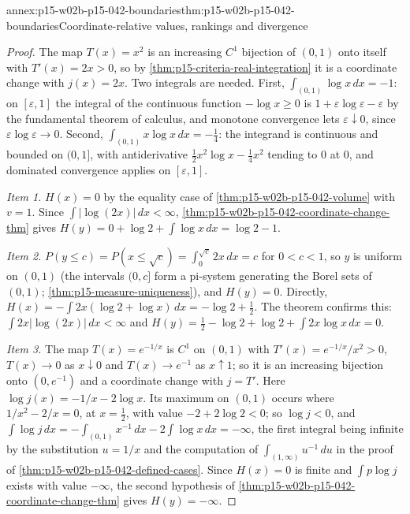 \begin{annexitem}{annex:p15-w02b-p15-042-boundaries}{thm:p15-w02b-p15-042-boundaries}{Coordinate-relative values, rankings and divergence}
\begin{proof}
The map \(T(x)=x^2\) is an increasing \(C^1\) bijection of \((0,1)\) onto
itself with \(T'(x)=2x>0\), so by \cref{thm:p15-criteria-real-integration}
it is a coordinate change with \(j(x)=2x\). Two integrals are needed. First,
\(\int_{(0,1)}\log x\,dx=-1\): on \([\varepsilon,1]\) the integral of the
continuous function \(-\log x\geq0\) is
\(1+\varepsilon\log\varepsilon-\varepsilon\) by the fundamental theorem of
calculus, and monotone convergence lets \(\varepsilon\downarrow0\), since
\(\varepsilon\log\varepsilon\to0\). Second,
\(\int_{(0,1)}x\log x\,dx=-\tfrac14\): the integrand is continuous and
bounded on \((0,1]\), with antiderivative \(\tfrac12x^2\log x-\tfrac14x^2\)
tending to \(0\) at \(0\), and dominated convergence applies on
\([\varepsilon,1]\).

\emph{Item 1.} \(H(x)=0\) by the equality case of
\cref{thm:p15-w02b-p15-042-volume} with \(v=1\). Since
\(\int|\log(2x)|\,dx<\infty\),
\cref{thm:p15-w02b-p15-042-coordinate-change-thm} gives
\(H(y)=0+\log2+\int\log x\,dx=\log2-1\).

\emph{Item 2.} \(P(y\leq c)=P(x\leq\sqrt c)=\int_0^{\sqrt c}2x\,dx=c\) for
\(0<c<1\), so \(y\) is uniform on \((0,1)\) (the intervals \((0,c]\) form a
pi-system generating the Borel sets of \((0,1)\);
\cref{thm:p15-measure-uniqueness}), and \(H(y)=0\). Directly,
\(H(x)=-\int2x(\log2+\log x)\,dx=-\log2+\tfrac12\). The theorem confirms
this: \(\int2x|\log(2x)|\,dx<\infty\) and
\(H(y)=\tfrac12-\log2+\log2+\int2x\log x\,dx=0\).

\emph{Item 3.} The map \(T(x)=e^{-1/x}\) is \(C^1\) on \((0,1)\) with
\(T'(x)=e^{-1/x}/x^2>0\), \(T(x)\to0\) as \(x\downarrow0\) and
\(T(x)\to e^{-1}\) as \(x\uparrow1\); so it is an increasing bijection onto
\((0,e^{-1})\) and a coordinate change with \(j=T'\). Here
\(\log j(x)=-1/x-2\log x\). Its maximum on \((0,1)\) occurs where
\(1/x^2-2/x=0\), at \(x=\tfrac12\), with value \(-2+2\log2<0\); so
\(\log j<0\), and
\(\int\log j\,dx=-\int_{(0,1)}x^{-1}\,dx-2\int\log x\,dx=-\infty\), the first
integral being infinite by the substitution \(u=1/x\) and the computation of
\(\int_{(1,\infty)}u^{-1}\,du\) in the proof of
\cref{thm:p15-w02b-p15-042-defined-cases}. Since \(H(x)=0\) is finite and
\(\int p\log j\) exists with value \(-\infty\), the second hypothesis of
\cref{thm:p15-w02b-p15-042-coordinate-change-thm} gives \(H(y)=-\infty\).


\end{proof}
\end{annexitem}
